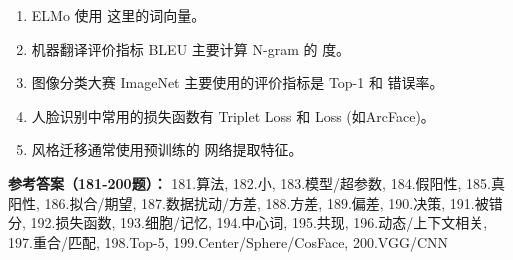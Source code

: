 \begin{enumerate}[resume,leftmargin=2em,itemsep=1pt]
\item ELMo 使用 \underline{\hspace{3em}} 这里的词向量。
\item 机器翻译评价指标 BLEU 主要计算 N-gram 的 \underline{\hspace{3em}} 度。
\item 图像分类大赛 ImageNet 主要使用的评价指标是 Top-1 和 \underline{\hspace{3em}} 错误率。
\item 人脸识别中常用的损失函数有 Triplet Loss 和 \underline{\hspace{3em}} Loss (如ArcFace)。
\item 风格迁移通常使用预训练的 \underline{\hspace{3em}} 网络提取特征。
\end{enumerate}

\textbf{参考答案（181-200题）：}
181.算法, 182.小, 183.模型/超参数, 184.假阳性, 185.真阳性, 186.拟合/期望, 187.数据扰动/方差, 188.方差, 189.偏差, 190.决策, 191.被错分, 192.损失函数, 193.细胞/记忆, 194.中心词, 195.共现, 196.动态/上下文相关, 197.重合/匹配, 198.Top-5, 199.Center/Sphere/CosFace, 200.VGG/CNN

